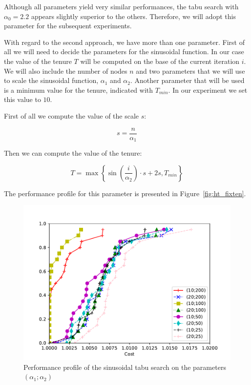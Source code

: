 \documentclass{article}
\begin{document}
Although all parameters yield very similar performances, the tabu search with $\alpha_0 = 2.2$
appears slightly superior to the others. Therefore, we will adopt this parameter for the subsequent experiments.

\clearpage

With regard to the second approach, we have more than one parameter. First of
all we will need to decide the parameters for the sinusoidal function. In our
case the value of the tenure $T$ will be computed on the base of the current
iteration $i$. We will also include the number of nodes $n$ and two parameters
that we will use to scale the sinusoidal function, $\alpha_1$ and $\alpha_2$.
Another parameter that will be used is a minimum value for the tenure,
indicated with $T_{min}$. In our experiment we set this value to $10$.

First of all we compute the value of the scale $s$:

\begin{equation*}
        s = \frac{n}{\alpha_1}
\end{equation*}

Then we can compute the value of the tenure:

\begin{equation*}
        T = \max \left\{
                \sin \left( \frac{i}{\alpha_2} \right) \cdot s + 2 s ,
                T_{min}
        \right\}
\end{equation*}

The performance profile for this parameter is presented in Figure~\ref{fig:ht_fixten}.

\begin{figure}[ht]
        \caption{Performance profile of the sinusoidal tabu search on the parameters $\left(\alpha_1; \alpha_2\right)$}
        \label{fig:ht_sinten}
        \centering
        \includegraphics[width=340pt]{assets/ht_sinten.pdf}
\end{figure}
\end{document}

